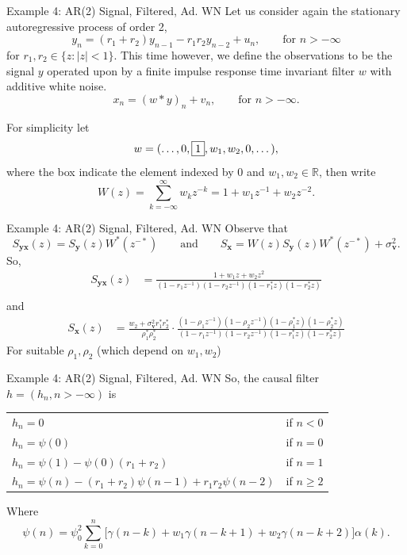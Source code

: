 \documentclass{beamer}  %
\newcommand{\R}{\mathbb{R}}
\renewcommand{\and}{\qquad \text{and}\qquad}
\begin{document}
\begin{frame}{Example 4: AR(2) Signal, Filtered, Ad. WN}
	Let us consider again the stationary autoregressive process of order 2,
	$$y_n = (r_1+r_2)y_{n-1} - r_1r_2 y_{n-2} + u_n , \qquad \text{for } n > -\infty$$
	for $r_1,r_2 \in \{z : |z|<1\}$.
	This time however, we define the observations to be the signal $y$ operated upon by a finite impulse response time invariant filter $w$ with additive white noise.
	$$x_n = (w * y)_n + v_n, \qquad \text{for } n > -\infty.$$
	
	For simplicity let $$ w = (\dots,0,\fbox{1},w_1, w_2,0,\dots),$$
	where the box indicate the element indexed by 0 and $w_1,w_2 \in \R$, then write
	$$W(z) = \sum_{k = -\infty}^\infty w_k z^{-k} = 1 + w_1 z^{-1} + w_2 z^{-2}.$$
	
\end{frame}	




\begin{frame}{Example 4: AR(2) Signal, Filtered, Ad. WN}
Observe that 
$$S_{\textbf{yx}}(z) = S_{\textbf{y}}(z)W^*(z^{-*}) \and S_{\textbf{x}} = W(z)S_{\textbf{y}}(z)W^*(z^{-*}) + \sigma_{\textbf{v}}^2.$$
So, 
\begin{align*}
S_{\textbf{yx}}(z) &= \frac{1 + w_1 z + w_2 z^{2}}{ (1 - r_1z^{-1})(1 - r_2z^{-1})(1 - r_1^*z)(1 - r_2^*z)}\\
\end{align*}
and
\begin{align*}
S_{\textbf{x}}(z) &=\frac{w_2 + \sigma_{\textbf{v}}^2r^*_1r^*_2}{\rho_1^*\rho_2^*}\cdot \frac{(1 - \rho_1z^{-1})(1 - \rho_2z^{-1})(1 - \rho_1^*z)(1 - \rho_2^*z)}{(1 - r_1z^{-1})(1 - r_2z^{-1})(1 - r_1^*z)(1 - r_2^*z)}
\end{align*} 
For suitable $\rho_1,\rho_2$ (which depend on $w_1,w_2$) 
\end{frame}	


\begin{frame}{Example 4: AR(2) Signal, Filtered, Ad. WN}
So, the causal filter $h = (h_n, n > -\infty)$ is 
\begin{center}
	\bigskip
	\begin{tabular}{l @{\qquad} r}
		$ h_n = 0 $ & if $n<0$ \\
		$ h_n = \psi(0) $ & if $n=0$ \\
		$ h_n = \psi(1) - \psi(0)(r_1+r_2) $ & if $n=1$ \\
		$ h_n = \psi(n) - (r_1+r_2)\psi(n-1) + r_1r_2 \psi(n-2) $ & if $n\ge2$
	\end{tabular}
\end{center}
	Where $$\psi(n) = \psi_0^2 \sum_{k=0}^n \big[\gamma(n-k) + w_1\gamma(n-k+1) + w_2\gamma(n-k+2)\big]\alpha(k).$$
\end{frame}	
\end{document}
